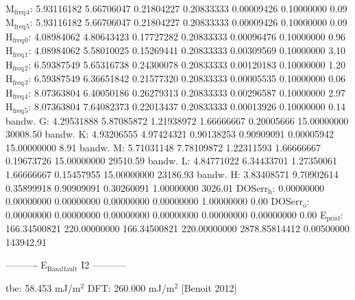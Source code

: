 \documentclass[11pt]{article}
\begin{document}
M\(_{\text{freq}}\)\(_{\text{4}}\):   5.93116182   5.66706047   0.21804227   0.20833333   0.00009426   0.10000000         0.09
M\(_{\text{freq}}\)\(_{\text{5}}\):   5.93116182   5.66706047   0.21804227   0.20833333   0.00009426   0.10000000         0.09
H\(_{\text{freq}}\)\(_{\text{0}}\):   4.08984062   4.80643423   0.17727282   0.20833333   0.00096476   0.10000000         0.96
H\(_{\text{freq}}\)\(_{\text{1}}\):   4.08984062   5.58010025   0.15269441   0.20833333   0.00309569   0.10000000         3.10
H\(_{\text{freq}}\)\(_{\text{2}}\):   6.59387549   5.65316738   0.24300078   0.20833333   0.00120183   0.10000000         1.20
H\(_{\text{freq}}\)\(_{\text{3}}\):   6.59387549   6.36651842   0.21577320   0.20833333   0.00005535   0.10000000         0.06
H\(_{\text{freq}}\)\(_{\text{4}}\):   8.07363804   6.40050186   0.26279313   0.20833333   0.00296587   0.10000000         2.97
H\(_{\text{freq}}\)\(_{\text{5}}\):   8.07363804   7.64082373   0.22013437   0.20833333   0.00013926   0.10000000         0.14
bandw. G:   4.29531888   5.87085872   1.21938972   1.66666667   0.20005666  15.00000000     30008.50
bandw. K:   4.93206555   4.97424321   0.90138253   0.90909091   0.00005942  15.00000000         8.91
bandw. M:   5.71031148   7.78109872   1.22311593   1.66666667   0.19673726  15.00000000     29510.59
bandw. L:   4.84771022   6.34433701   1.27350061   1.66666667   0.15457955  15.00000000     23186.93
bandw. H:   3.83408571   9.70902614   0.35899918   0.90909091   0.30260091   1.00000000      3026.01
DOSerr\(_{\text{h}}\):   0.00000000   0.00000000   0.00000000   0.00000000   0.00000000   1.00000000         0.00
DOSerr\(_{\text{o}}\):   0.00000000   0.00000000   0.00000000   0.00000000   0.00000000   0.00000000         0.00
E\(_{\text{pris}}\)\(_{\text{f}}\): 166.34500821 220.00000000 166.34500821 220.00000000 2878.85814412   0.00500000    143942.91

----------     E\(_{\text{Basal}}\)\(_{\text{fault}}\) I2     -----------

tbe:        58.453 mJ/m\(^{\text{2}}\)
DFT:       260.000 mJ/m\(^{\text{2}}\) [Benoit  2012]
\end{document}
